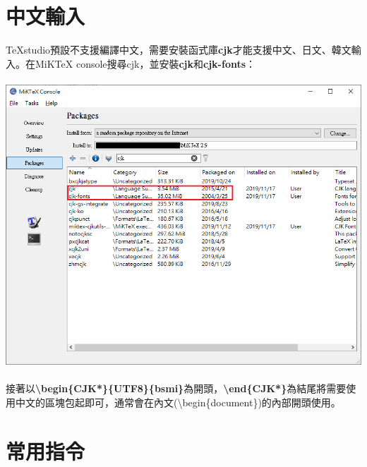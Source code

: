 \documentclass[12pt]{article}
\begin{document}
\begin{CJK*}{UTF8}{bsmi}
		\section{中文輸入}
			\hspace*{25pt}TeXstudio預設不支援編譯中文，需要安裝函式庫\textbf{cjk}才能支援中文、日文、韓文輸入。在MiKTeX console搜尋cjk，並安裝\textbf{cjk}和\textbf{cjk-fonts}： \\ \\
			\includegraphics[scale=0.7]{MiKTeX_console_cjk}\\ \\
			接著以\textbf{\textbackslash begin\{CJK*\}\{UTF8\}\{bsmi\}}為開頭，\textbf{\textbackslash end\{CJK*\}}為結尾將需要使用中文的區塊包起即可，通常會在內文(\textbackslash begin\{document\})的內部開頭使用。
			
		\newpage
		\section{常用指令}
		

\end{CJK*}
\end{document}

